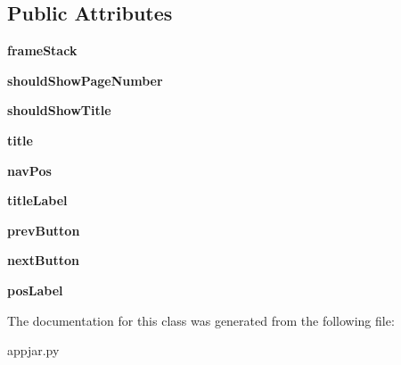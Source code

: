 \subsection*{Public Attributes}
\begin{DoxyCompactItemize}
\item 
\mbox{\label{class_python_01_g_u_i_1_1appjar_1_1_paged_window_ae95a90b73531875f717d07876bb091e5}} 
{\bfseries frame\+Stack}
\item 
\mbox{\label{class_python_01_g_u_i_1_1appjar_1_1_paged_window_abba7e4f25ff0e29b4120b365ebe6110d}} 
{\bfseries should\+Show\+Page\+Number}
\item 
\mbox{\label{class_python_01_g_u_i_1_1appjar_1_1_paged_window_a0efb938d0fe02801ee943031aa44dc69}} 
{\bfseries should\+Show\+Title}
\item 
\mbox{\label{class_python_01_g_u_i_1_1appjar_1_1_paged_window_a6d9774afd036be44a5e1e1a2aa1a4d12}} 
{\bfseries title}
\item 
\mbox{\label{class_python_01_g_u_i_1_1appjar_1_1_paged_window_a9d78b4eff26dcea567e1b7e3f240df40}} 
{\bfseries nav\+Pos}
\item 
\mbox{\label{class_python_01_g_u_i_1_1appjar_1_1_paged_window_ae4e3fb3f74218218c7a67bcebcdab8bf}} 
{\bfseries title\+Label}
\item 
\mbox{\label{class_python_01_g_u_i_1_1appjar_1_1_paged_window_a11bd4162afdfed73adeb3a1a81f01739}} 
{\bfseries prev\+Button}
\item 
\mbox{\label{class_python_01_g_u_i_1_1appjar_1_1_paged_window_a1572c8bcc695dc8294b411c8a91ba3bf}} 
{\bfseries next\+Button}
\item 
\mbox{\label{class_python_01_g_u_i_1_1appjar_1_1_paged_window_a8cb9add298c82f795114347f670f2d45}} 
{\bfseries pos\+Label}
\end{DoxyCompactItemize}


The documentation for this class was generated from the following file\+:\begin{DoxyCompactItemize}
\item 
appjar.\+py\end{DoxyCompactItemize}
